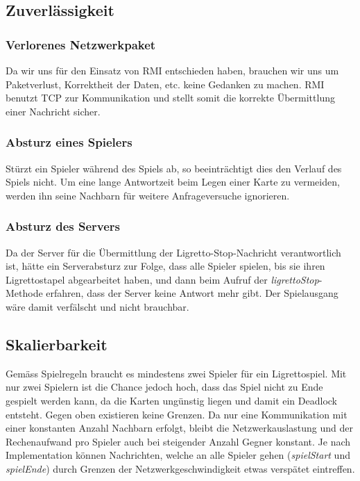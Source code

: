 \subsection{Zuverlässigkeit}

\subsubsection{Verlorenes Netzwerkpaket}
Da wir uns für den Einsatz von RMI entschieden haben, brauchen wir uns um Paketverlust, Korrektheit der Daten, etc. keine Gedanken zu machen. RMI benutzt TCP zur Kommunikation und stellt somit die korrekte Übermittlung einer Nachricht sicher.

\subsubsection{Absturz eines Spielers}
Stürzt ein Spieler während des Spiels ab, so beeinträchtigt dies den Verlauf des Spiels nicht. Um eine lange Antwortzeit beim Legen einer Karte zu vermeiden, werden ihn seine Nachbarn für weitere Anfrageversuche ignorieren.

\subsubsection{Absturz des Servers}
Da der Server für die Übermittlung der Ligretto-Stop-Nachricht verantwortlich ist, hätte ein Serverabsturz zur Folge, dass alle Spieler spielen, bis sie ihren Ligrettostapel abgearbeitet haben, und dann beim Aufruf der \textit{ligrettoStop}-Methode erfahren, dass der Server keine Antwort mehr gibt. Der Spielausgang wäre damit verfälscht und nicht brauchbar.

\subsection{Skalierbarkeit}

Gemäss Spielregeln braucht es mindestens zwei Spieler für ein Ligrettospiel. Mit nur zwei Spielern ist die Chance jedoch hoch, dass das Spiel nicht zu Ende gespielt werden kann, da die Karten ungünstig liegen und damit ein Deadlock entsteht. Gegen oben existieren keine Grenzen. Da nur eine Kommunikation mit einer konstanten Anzahl Nachbarn erfolgt, bleibt die Netzwerkauslastung und der Rechenaufwand pro Spieler auch bei steigender Anzahl Gegner konstant. Je nach Implementation können Nachrichten, welche an alle Spieler gehen (\textit{spielStart} und \textit{spielEnde}) durch Grenzen der Netzwerkgeschwindigkeit etwas verspätet eintreffen.

